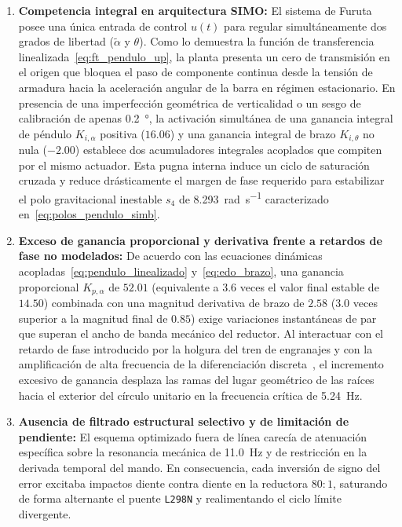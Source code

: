 \begin{enumerate}
    \item \textbf{Competencia integral en arquitectura SIMO:} El sistema de Furuta posee una única entrada de control $u(t)$ para regular simultáneamente dos grados de libertad ($\tilde{\alpha}$ y $\theta$). Como lo demuestra la función de transferencia linealizada~\eqref{eq:ft_pendulo_up}, la planta presenta un cero de transmisión en el origen que bloquea el paso de componente continua desde la tensión de armadura hacia la aceleración angular de la barra en régimen estacionario. En presencia de una imperfección geométrica de verticalidad o un sesgo de calibración de apenas \qty{0.2}{\degree}, la activación simultánea de una ganancia integral de péndulo $K_{i,\alpha}$ positiva ($16.06$) y una ganancia integral de brazo $K_{i,\theta}$ no nula ($-2.00$) establece dos acumuladores integrales acoplados que compiten por el mismo actuador. Esta pugna interna induce un ciclo de saturación cruzada y reduce drásticamente el margen de fase requerido para estabilizar el polo gravitacional inestable $s_4$ de \qty{+8.293}{\radian\per\second} caracterizado en~\eqref{eq:polos_pendulo_simb}.
    \item \textbf{Exceso de ganancia proporcional y derivativa frente a retardos de fase no modelados:} De acuerdo con las ecuaciones dinámicas acopladas~\eqref{eq:pendulo_linealizado} y~\eqref{eq:edo_brazo}, una ganancia proporcional $K_{p,\alpha}$ de $52.01$ (equivalente a $3.6$ veces el valor final estable de $14.50$) combinada con una magnitud derivativa de brazo de $2.58$ ($3.0$ veces superior a la magnitud final de $0.85$) exige variaciones instantáneas de par que superan el ancho de banda mecánico del reductor. Al interactuar con el retardo de fase introducido por la holgura del tren de engranajes y con la amplificación de alta frecuencia de la diferenciación discreta~\cite{Merry2010}, el incremento excesivo de ganancia desplaza las ramas del lugar geométrico de las raíces hacia el exterior del círculo unitario en la frecuencia crítica de \qty{5.24}{\hertz}.
    \item \textbf{Ausencia de filtrado estructural selectivo y de limitación de pendiente:} El esquema optimizado fuera de línea carecía de atenuación específica sobre la resonancia mecánica de \qty{11.0}{\hertz} y de restricción en la derivada temporal del mando. En consecuencia, cada inversión de signo del error excitaba impactos diente contra diente en la reductora $80:1$, saturando de forma alternante el puente \texttt{L298N} y realimentando el ciclo límite divergente.
\end{enumerate}


